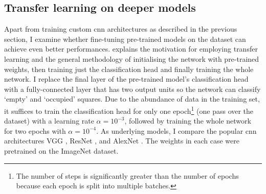 \documentclass[../report.tex]{subfiles}
\begin{document}
\subsection{Transfer learning on deeper models}
\label{sec:occupancy_transfer_learning}
Apart from training custom \gls{cnn} architectures as described in the previous section, I examine whether fine-tuning pre-trained models on the dataset can achieve even better performances.
 explains the motivation for employing transfer learning and the general methodology of initialising the network with pre-trained weights, then training just the classification head and finally training the whole network.
I replace the final layer of the pre-trained model's classification head with a fully-connected layer that has two output units so the network can classify `empty' and `occupied' squares.
Due to the abundance of data in the training set, it suffices to train the classification head for only one epoch\footnote{The number of steps is significantly greater than the number of epochs because each epoch is split into multiple batches.} (one pass over the dataset) with a learning rate $\alpha=10^{-3}$, followed by training the whole network for two epochs with $\alpha=10^{-4}$.
As underlying models, I compare the popular \gls{cnn} architectures
VGG \cite{simonyan2015},
ResNet \cite{he2016}, and
AlexNet \cite{krizhevsky2017}.
The weights in each case were pretrained on the ImageNet \cite{deng2009} dataset.
\end{document}
